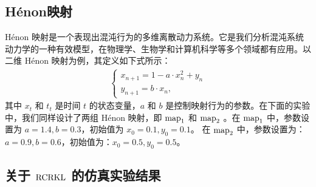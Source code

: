 \subsection{H\'{e}non映射}

H\'{e}non 映射是一个表现出混沌行为的多维离散动力系统。它是我们分析混沌系统动力学的一种有效模型，在物理学、生物学和计算机科学等多个领域都有应用。以二维 H\'{e}non 映射为例，其定义如下式所示：
\begin{align*}
\begin{cases}
x_{n+1} = 1- a \cdot x^{2}_{n}+y_{n}\\
y_{n+1} = b\cdot x_{n},
\end{cases}
\end{align*}
其中 $x_{t}$ 和 $t_{t}$ 是时间 $t$ 的状态变量，$a$ 和 $b$ 是控制映射行为的参数。在下面的实验中，我们同样设计了两组 H\'{e}non 映射，即 $\rm{map}_1$ 和 $\rm{map}_2$ 。在 $\rm{map}_1$ 中，参数设置为 $a = 1.4, b = 0.3$，初始值为 $x_{0} = 0.1, y_{0} = 0.1$。 在 $\rm{map}_2$ 中，参数设置为：$a = 0.9, b = 0.6$，初始值为：$x_{0}=0.5, y_{0}=0.5$。

\subsection{关于 $\rm{RCRKL}$ 的仿真实验结果}

